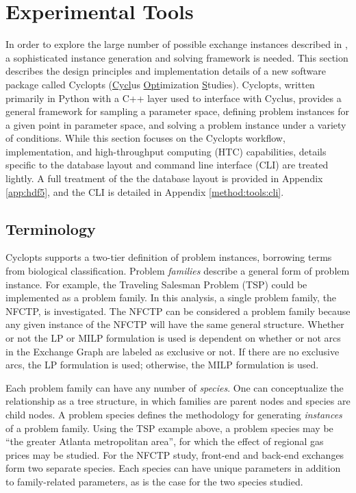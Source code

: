 
\section{Experimental Tools}\label{method:tools}

In order to explore the large number of possible exchange instances described in
, a sophisticated instance generation and solving framework
is needed. This section describes the design principles and implementation
details of a new software package called Cyclopts (\underline{Cycl}us
\underline{Opt}imization \underline{S}tudies). Cyclopts, written primarily in
Python with a C++ layer used to interface with Cyclus, provides a general
framework for sampling a parameter space, defining problem instances for a given
point in parameter space, and solving a problem instance under a variety of
conditions. While this section focuses on the Cyclopts workflow, implementation,
and high-throughput computing (HTC) capabilities, details specific to the
database layout and command line interface (CLI) are treated lightly. A full
treatment of the the database layout is provided in Appendix \ref{app:hdf5}, and
the CLI is detailed in Appendix \ref{method:tools:cli}.

\subsection{Terminology}\label{method:tools:term}

Cyclopts supports a two-tier definition of problem instances, borrowing terms
from biological classification. Problem \textit{families} describe a general
form of problem instance. For example, the Traveling Salesman Problem (TSP)
could be implemented as a problem family. In this analysis, a single problem
family, the NFCTP, is investigated. The NFCTP can be considered a problem family
because any given instance of the NFCTP will have the same general
structure. Whether or not the LP or MILP formulation is used is dependent on
whether or not arcs in the Exchange Graph are labeled as exclusive or not. If
there are no exclusive arcs, the LP formulation is used; otherwise, the MILP
formulation is used.

Each problem family can have any number of \textit{species}. One can
conceptualize the relationship as a tree structure, in which families are parent
nodes and species are child nodes. A problem species defines the methodology for
generating \textit{instances} of a problem family. Using the TSP example above,
a problem species may be ``the greater Atlanta metropolitan area'', for which
the effect of regional gas prices may be studied. For the NFCTP study, front-end
and back-end exchanges form two separate species. Each species can have unique
parameters in addition to family-related parameters, as is the case for the two
species studied.

